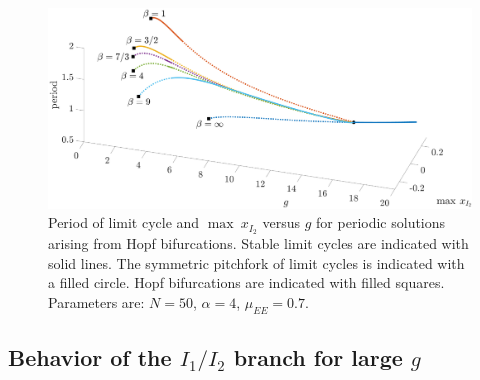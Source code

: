 \documentclass[reqno]{siamonline190516}
\begin{document}
\begin{figure}
    \label{fig:periodvsg}
\end{figure}

\begin{figure}
    \centering
    \hspace{-1cm}
    \includegraphics[width=17.25cm]{periodvsgN50.eps}
    \caption{Period of limit cycle and $\max \: x_{I_2}$ versus $g$ for periodic solutions arising from Hopf bifurcations. Stable limit cycles are indicated with solid lines. The symmetric pitchfork of limit cycles is indicated with a filled circle. Hopf bifurcations are indicated with filled squares. Parameters are: $N = 50$,  $\alpha = 4$, $\mu_{EE} = 0.7$.}
    \label{fig:periodvsg50}
\end{figure}

\subsection{Behavior of the \texorpdfstring{$I_1/I_2$}{I1/I2} branch for large \texorpdfstring{$g$}{g}}\label{sec:stab_largeg}
\end{document}
